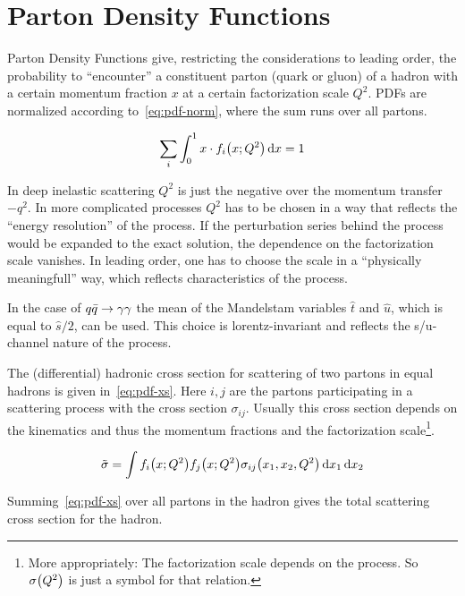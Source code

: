 
\section{Parton Density Functions}%
\label{sec:pdf_basics}

Parton Density Functions give, restricting the considerations to
leading order, the probability to ``encounter'' a constituent parton
(quark or gluon) of a hadron with a certain momentum fraction \(x\) at
a certain factorization scale \(Q^2\). PDFs are normalized according
to~\eqref{eq:pdf-norm}, where the sum runs over all partons.

\begin{equation}
  \label{eq:pdf-norm}
  \sum_i\int_0^1x\cdot f_i\qty(x;Q^2) \dd{x} = 1
\end{equation}

In deep inelastic scattering \(Q^2\) is just the negative over the
momentum transfer \(-q^2\). In more complicated processes \(Q^2\) has
to be chosen in a way that reflects the ``energy resolution'' of the
process. If the perturbation series behind the process would be
expanded to the exact solution, the dependence on the factorization
scale vanishes. In leading order, one has to choose the scale in a
``physically meaningfull'' way, which reflects characteristics of the
process.

In the case of \(q\bar{q}\rightarrow\gamma\gamma\) the mean of the Mandelstam variables \(\hat{t}\)
and \(\hat{u}\), which is equal to \(\hat{s}/2\), can be used. This
choice is lorentz-invariant and reflects the s/u-channel nature of the
process.

The (differential) hadronic cross section for scattering of two
partons in equal hadrons is given in~\eqref{eq:pdf-xs}. Here \(i,j\) are
the partons participating in a scattering process with the cross
section \(\sigma_{ij}\). Usually this cross section depends on the
kinematics and thus the momentum fractions and the factorization
scale\footnote{More appropriately: The factorization scale depends on
  the process. So \(\sigma\qty(Q^2)\) is just a symbol for that
  relation.}.

\begin{equation}
  \label{eq:pdf-xs}
  \tilde{\sigma} = \int f_i\qty(x;Q^2) f_j\qty(x;Q^2) \sigma_{ij}\qty(x_1,
  x_2, Q^2)\dd{x_1}\dd{x_2}
\end{equation}

Summing~\eqref{eq:pdf-xs} over all partons in the hadron gives
the total scattering cross section for the hadron.
